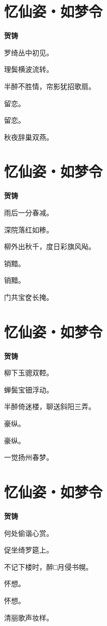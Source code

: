 \documentclass[12pt,a4paper]{ctexbook}
\begin{document}
\section{忆仙姿・如梦令}
\textbf{贺铸}\par\vspace{0.5em}
罗绮丛中初见。\par
理鬓横波流转。\par
半醉不胜情，帘影犹招歌扇。\par
留恋。\par
留恋。\par
秋夜辞巢双燕。\par

\section{忆仙姿・如梦令}
\textbf{贺铸}\par\vspace{0.5em}
雨后一分春减。\par
深院落红如糁。\par
柳外出秋千，度日彩旗风飐。\par
销黯。\par
销黯。\par
门共宝奁长掩。\par

\section{忆仙姿・如梦令}
\textbf{贺铸}\par\vspace{0.5em}
柳下玉骢双鞚。\par
蝉鬓宝钿浮动。\par
半醉倚迷楼，聊送斜阳三弄。\par
豪纵。\par
豪纵。\par
一觉扬州春梦。\par

\section{忆仙姿・如梦令}
\textbf{贺铸}\par\vspace{0.5em}
何处偷谐心赏。\par
促坐绮罗筵上。\par
不记下楼时，醉□月侵书幌。\par
怀想。\par
怀想。\par
清丽歌声妆样。\par
\end{document}

